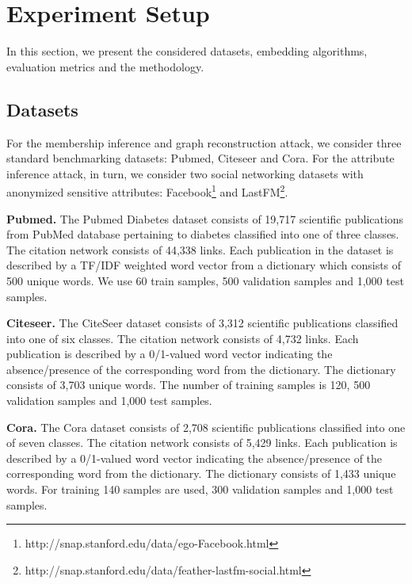 \section{Experiment Setup}\label{setup}

In this section, we present the considered datasets, embedding algorithms, evaluation metrics and the methodology.

\subsection{Datasets}

For the membership inference and graph reconstruction attack, we consider three standard benchmarking datasets: Pubmed, Citeseer and Cora.
For the attribute inference attack, in turn, we consider two social networking datasets with anonymized sensitive attributes: Facebook\footnote{http://snap.stanford.edu/data/ego-Facebook.html} and LastFM\footnote{http://snap.stanford.edu/data/feather-lastfm-social.html}.

\noindent\textbf{Pubmed.} The Pubmed Diabetes dataset consists of 19,717 scientific publications from PubMed database pertaining to diabetes classified into one of three classes. The citation network consists of 44,338 links. Each publication in the dataset is described by a TF/IDF weighted word vector from a dictionary which consists of 500 unique words.
We use 60 train samples, 500 validation samples and 1,000 test samples.

\noindent\textbf{Citeseer.} The CiteSeer dataset consists of 3,312 scientific publications classified into one of six classes.
The citation network consists of 4,732 links.
Each publication is described by a 0/1-valued word vector indicating the absence/presence of the corresponding word from the dictionary.
The dictionary consists of 3,703 unique words.
The number of training samples is 120, 500 validation samples and 1,000 test samples.

\noindent\textbf{Cora.} The Cora dataset consists of 2,708 scientific publications classified into one of seven classes.
The citation network consists of 5,429 links. Each publication is described by a 0/1-valued word vector indicating the absence/presence of the corresponding word from the dictionary.
The dictionary consists of 1,433 unique words.
For training 140 samples are used, 300 validation samples and 1,000 test samples.

